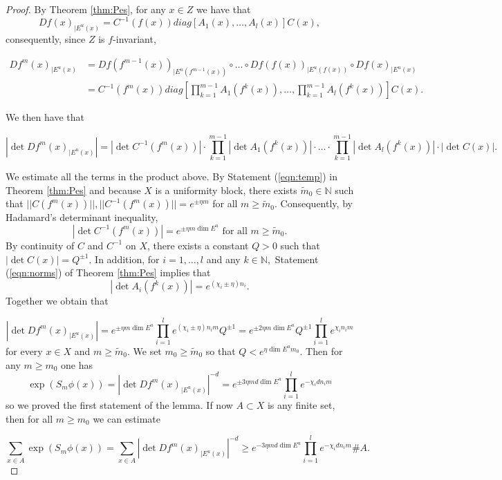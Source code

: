 \documentclass[10pt,a4paper]{amsart}
\begin{document}
\begin{proof}
By Theorem \ref{thm:Pes}, for any $x\in Z$ we have that
$$  Df(x)_{| E^u(x)} = C^{-1}(f(x))  diag[   A_1(x), \ldots  ,  A_l(x)] C(x),  $$
consequently, since $Z$ is $f$-invariant,


\begin{align*}
  Df^m(x)_{| E^u(x)} & =    Df(f^{m-1}(x))   _{| E^u(f^{m-1}(x))}  \circ   \ldots   \circ    Df(f(x))   _{| E^u(f(x))}   \circ    Df(x) _{| E^u(x)}   \\
&= C^{-1}(f^m(x))  diag[  \prod_{k=1}^{m-1}  A_1(f^k(x)), \ldots  , \prod_{k=1}^{m-1}  A_l(f^k(x))] C(x).
\end{align*}



We then have that

$$   | \det Df^m(x)_{| E^u(x)}  | =  |\det C^{-1}(f^m(x)) | \cdot   \prod_{k=1}^{m-1} |\det  A_1(f^k(x))|\cdot \ldots  \cdot \prod_{k=1}^{m-1}  | \det A_l(f^k(x)) | \cdot |\det C(x)|. $$

We estimate all the terms in the product above.
By Statement (\ref{eqn:temp}) in Theorem \ref{thm:Pes} and because $X$ is a uniformity block, there exists $\tilde{m}_0\in\mathbb{N}$ such that
 $||   C( f^m(x))||, ||C^{-1}( f^m(x))||=  e^{ \pm \eta m}$ for all $m\geq \tilde{m}_0$. Consequently, by Hadamard's determinant inequality,
$$    |\det C^{-1}(f^m(x)) | =  e^{ \pm \eta m   \dim E^u}  \text{ for all $m\geq \tilde{m}_0$}. $$
By continuity of $C$ and $C^{-1}$ on $X$, there exists a constant $Q>0$ such that $  |\det C(x)|   = Q^{\pm 1}. $
In addition, for $i=1,\ldots, l$ and any $k\in\mathbb{N},$ Statement (\ref{eqn:norms}) of Theorem \ref{thm:Pes} implies that 
$$  |\det A_i(f^k(x))|   = e^{(\chi_i \pm \eta) n_i}. $$
Together we obtain that 


$$     | \det Df^m(x)_{| E^u(x)}  | =  e^{ \pm \eta m   \dim E^u}   \prod_{i=1}^{l}   e^{(\chi_i \pm \eta) n_i   m } Q^{\pm 1}   
 =    e^{ \pm 2 \eta m   \dim E^u} Q^{\pm 1}    \prod_{i=1}^{l}   e^{\chi_i  n_i   m }  $$
for every $x\in X$ and $m\geq \tilde{m}_0$. We set $m_0\geq \tilde{m}_0$ so that $Q< e^{\eta \dim E^u m_0}.$
Then for any $m\geq m_0$ one has
$$     \exp (S_m\phi (x)) =   | \det Df^m(x)_{| E^u(x)}  | ^{-d} =     e^{  \pm 3 \eta m d   \dim E^u}     \prod_{i=1}^{l}   e^{-\chi_i    d n_i   m } $$
so we proved the first statement of the lemma.
If now $    A \subset X$ is any finite set, then for all $m\geq m_0$ we can estimate

$$  \sum_{x\in A} \exp (S_m\phi (x)) = \sum_{x\in A }    | \det Df^m(x)_{| E^u(x)}  | ^{-d}   \geq     e^{ -  3 \eta m d   \dim E^u}    \prod_{i=1}^{l}   e^{-\chi_i    d n_i   m }  \# A.   $$


\end{proof}
\end{document}
